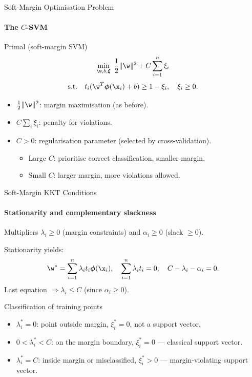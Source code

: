 \begin{frame}{Soft-Margin Optimisation Problem}
  \framesubtitle{The $C$-SVM}
  \begin{block}{Primal (soft-margin SVM)}
    \[
      \min_{\w,b,\boldsymbol{\xi}} \;\frac{1}{2}\|\w\|^2 + C\sum_{i=1}^n \xi_i
    \]
    \[
      \text{s.t.}\quad t_i(\w^T\boldsymbol{\phi}(\x_i)+b) \ge 1-\xi_i,\quad \xi_i\ge 0.
    \]
  \end{block}
  \begin{itemize}
    \item $\tfrac{1}{2}\|\w\|^2$: \alert{margin maximisation} (as before).
    \item $C\sum_i \xi_i$: \alert{penalty} for violations.
    \item $C > 0$: regularisation parameter (selected by cross-validation).
      \begin{itemize}
        \item Large $C$: prioritise correct classification, smaller margin.
        \item Small $C$: larger margin, more violations allowed.
      \end{itemize}
  \end{itemize}
\end{frame}

\begin{frame}{Soft-Margin KKT Conditions}
  \framesubtitle{Stationarity and complementary slackness}
  Multipliers $\lambda_i \ge 0$ (margin constraints) and $\alpha_i \ge 0$ (slack $\ge 0$).

  Stationarity yields:
  \[
    \w^* = \sum_{i=1}^n \lambda_i t_i \boldsymbol{\phi}(\x_i), \quad
    \sum_{i=1}^n \lambda_i t_i = 0, \quad
    C - \lambda_i - \alpha_i = 0.
  \]
  Last equation $\Rightarrow \lambda_i \le C$ (since $\alpha_i \ge 0$).

  \vspace{0.4em}
  \begin{block}{Classification of training points}
    \begin{itemize}
      \item $\lambda_i^* = 0$: point outside margin, $\xi_i^* = 0$, not a support vector.
      \item $0 < \lambda_i^* < C$: on the margin boundary, $\xi_i^* = 0$ — \alert{classical support vector}.
      \item $\lambda_i^* = C$: inside margin or misclassified, $\xi_i^* > 0$ — \alert{margin-violating support vector}.
    \end{itemize}
  \end{block}
\end{frame}

